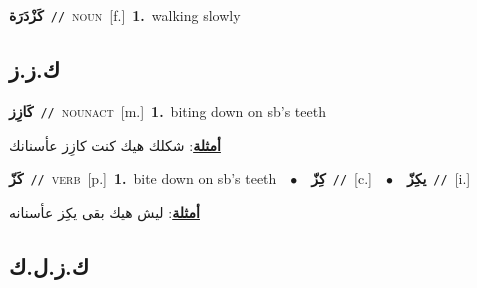 \documentclass[10pt,a4paper,twoside]{article} %
\begin{document}
\begin{multicols}{2}
{\setlength\topsep{0pt}\textbf{\foreignlanguage{arabic}{كَزْدَرَة}}\ {\color{gray}\texttt{//}\color{black}}\ \textsc{noun}\ [f.]\ \textbf{1.}~walking slowly\ } \vspace{2mm}

\vspace{-3mm}
\subsection*{\color{blue}\foreignlanguage{arabic}{ك.ز.ز}\color{blue}{}} 

{\setlength\topsep{0pt}\textbf{\foreignlanguage{arabic}{كَازِز}}\ {\color{gray}\texttt{//}\color{black}}\ \textsc{noun\textunderscore act}\ [m.]\ \textbf{1.}~biting down on sb's teeth\  \begin{flushright}\color{gray}\foreignlanguage{arabic}{\textbf{\underline{\foreignlanguage{arabic}{أمثلة}}}: شكلك هيك كنت كازِز عأسنانك}\end{flushright}\color{black}} \vspace{2mm}

{\setlength\topsep{0pt}\textbf{\foreignlanguage{arabic}{كَزّ}}\ {\color{gray}\texttt{//}\color{black}}\ \textsc{verb}\ [p.]\ \textbf{1.}~bite down on sb's teeth\ \ $\bullet$\ \ \setlength\topsep{0pt}\textbf{\foreignlanguage{arabic}{كِزّ}}\ {\color{gray}\texttt{//}\color{black}}\ [c.]\ \ $\bullet$\ \ \setlength\topsep{0pt}\textbf{\foreignlanguage{arabic}{يكِزّ}}\ {\color{gray}\texttt{//}\color{black}}\ [i.]\  \begin{flushright}\color{gray}\foreignlanguage{arabic}{\textbf{\underline{\foreignlanguage{arabic}{أمثلة}}}: ليش هيك بقى يكِز عأسنانه}\end{flushright}\color{black}} \vspace{2mm}

\vspace{-3mm}
\subsection*{\color{blue}\foreignlanguage{arabic}{ك.ز.ل.ك}\color{blue}{}} 


\end{multicols}
\end{document}
